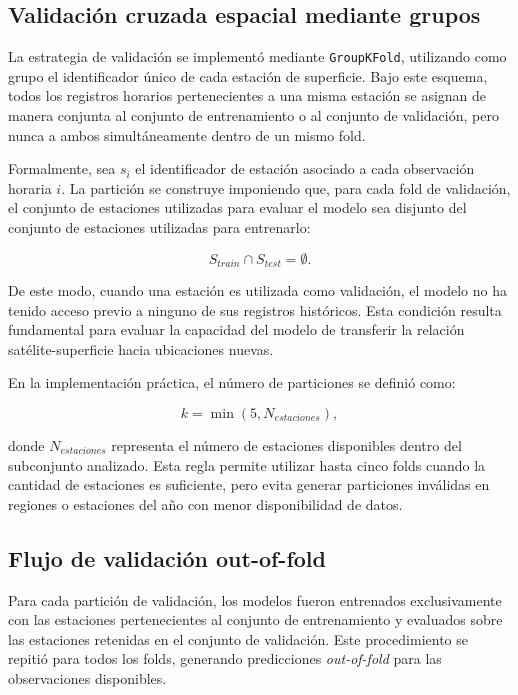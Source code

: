 \documentclass[../main.tex]{subfiles}
\begin{document}
\subsection{Validación cruzada espacial mediante grupos}

La estrategia de validación se implementó mediante \texttt{GroupKFold}, utilizando como grupo el identificador único de cada estación de superficie. Bajo este esquema, todos los registros horarios pertenecientes a una misma estación se asignan de manera conjunta al conjunto de entrenamiento o al conjunto de validación, pero nunca a ambos simultáneamente dentro de un mismo fold.

Formalmente, sea $s_i$ el identificador de estación asociado a cada observación horaria $i$. La partición se construye imponiendo que, para cada fold de validación, el conjunto de estaciones utilizadas para evaluar el modelo sea disjunto del conjunto de estaciones utilizadas para entrenarlo:

\begin{equation}
S_{train} \cap S_{test} = \emptyset.
\end{equation}

De este modo, cuando una estación es utilizada como validación, el modelo no ha tenido acceso previo a ninguno de sus registros históricos. Esta condición resulta fundamental para evaluar la capacidad del modelo de transferir la relación satélite-superficie hacia ubicaciones nuevas.

En la implementación práctica, el número de particiones se definió como:

\begin{equation}
k = \min(5, N_{estaciones}),
\end{equation}

donde $N_{estaciones}$ representa el número de estaciones disponibles dentro del subconjunto analizado. Esta regla permite utilizar hasta cinco folds cuando la cantidad de estaciones es suficiente, pero evita generar particiones inválidas en regiones o estaciones del año con menor disponibilidad de datos.

\subsection{Flujo de validación out-of-fold}

Para cada partición de validación, los modelos fueron entrenados exclusivamente con las estaciones pertenecientes al conjunto de entrenamiento y evaluados sobre las estaciones retenidas en el conjunto de validación. Este procedimiento se repitió para todos los folds, generando predicciones \textit{out-of-fold} para las observaciones disponibles.
\end{document}
